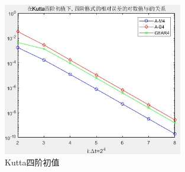 \documentclass[12pt]{article}
\begin{document}
\begin{figure}[H]
	\centering
	\includegraphics[width=0.7\textwidth]{8}
	\caption{Kutta四阶初值}
\end{figure}
\end{document}
